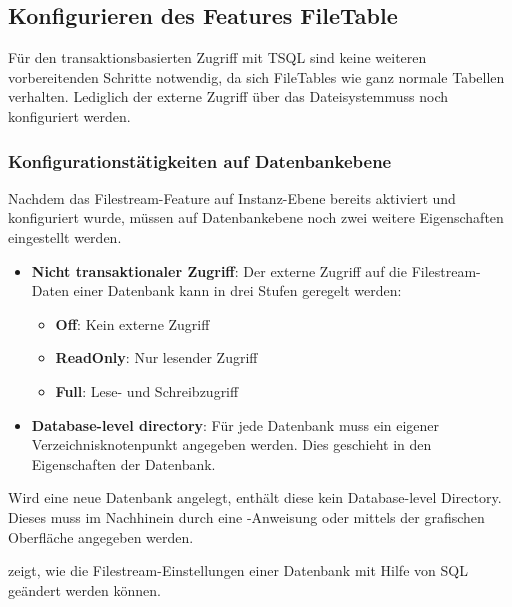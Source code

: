       \subsection{Konfigurieren des Features FileTable}
        Für den transaktionsbasierten Zugriff mit TSQL sind keine weiteren
        vorbereitenden Schritte notwendig, da sich FileTables wie ganz normale
        Tabellen verhalten. Lediglich der externe Zugriff über das
        Dateisystemmuss noch konfiguriert werden.
        \subsubsection{Konfigurationstätigkeiten auf Datenbankebene}
          Nachdem das Filestream-Feature auf Instanz-Ebene bereits aktiviert und
          konfiguriert wurde, müssen auf Datenbankebene noch zwei weitere
          Eigenschaften eingestellt werden.
          \begin{itemize}
              \item \textbf{Nicht transaktionaler Zugriff}: Der externe Zugriff
              auf die Filestream-Daten einer Datenbank kann in drei Stufen
              geregelt werden:
              \begin{itemize}
                  \item \textbf{Off}: Kein externe Zugriff
                  \item \textbf{ReadOnly}: Nur lesender Zugriff
                  \item \textbf{Full}: Lese- und Schreibzugriff
              \end{itemize}
              \item \textbf{Database-level directory}: Für jede Datenbank
              muss ein eigener Verzeichnisknotenpunkt angegeben werden. Dies
              geschieht in den Eigenschaften der Datenbank.
          \end{itemize}
          \begin{merke}
            Wird eine neue Datenbank angelegt, enthält diese kein Database-level
            Directory. Dieses muss im Nachhinein durch eine -Anweisung oder mittels der grafischen Oberfläche angegeben
            werden.
          \end{merke}
           zeigt, wie die Filestream-Einstellungen einer
          Datenbank mit Hilfe von SQL geändert werden können.
